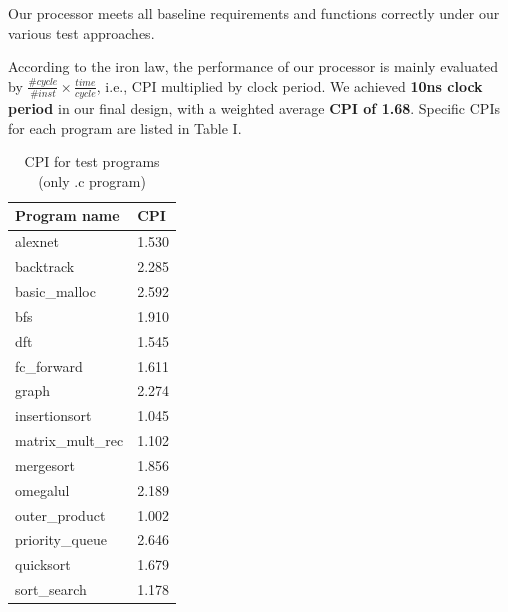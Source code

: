 Our processor meets all baseline requirements and functions correctly under our various test approaches.

According to the iron law, the performance of our processor is mainly evaluated by $\frac{\#cycle}{\#inst}\times\frac{time}{cycle}$, i.e., CPI multiplied by clock period. We achieved \textbf{10ns clock period} in our final design, with a weighted average \textbf{CPI of 1.68}. Specific CPIs for each program are listed in Table I.

\begin{table}[htbp]
\centering
\label{ProgramCPI}
\caption{CPI for test programs (only .c program)}
\begin{tabular}{ll} 
\hline\hline
Program name      & CPI    \\ 
\hline
alexnet           & 1.530  \\
backtrack         & 2.285  \\
basic\_malloc     & 2.592  \\
bfs               & 1.910  \\
dft               & 1.545  \\
fc\_forward       & 1.611  \\
graph             & 2.274  \\
insertionsort     & 1.045  \\
matrix\_mult\_rec & 1.102  \\
mergesort         & 1.856  \\
omegalul          & 2.189  \\
outer\_product    & 1.002  \\
priority\_queue   & 2.646  \\
quicksort         & 1.679  \\
sort\_search      & 1.178  \\
\hline\hline
\end{tabular}
\end{table}
